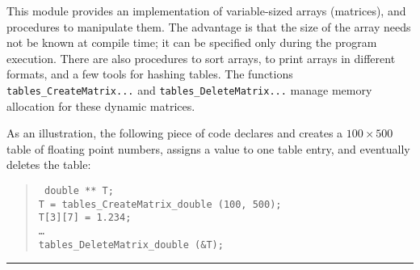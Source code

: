 
This module provides an implementation of variable-sized arrays (matrices),
and procedures to manipulate them.
The advantage is that the size of the array needs not be known
at compile time; it can be specified only during the program execution.
There are also procedures to sort arrays,  to
print  arrays in different formats,
and a few tools for hashing tables.
The functions {\tt tables\_CreateMatrix...} and
{\tt tables\_DeleteMatrix...} manage memory allocation for
these dynamic matrices.

As an illustration, the following piece of code declares and creates
a $100\times 500$ table of floating point numbers, assigns a value
to one table entry, and eventually deletes the table:
  \begin{verse}{\tt
    double ** T;\\
    T = tables\_CreateMatrix\_double (100, 500);\\
    T[3][7] = 1.234;\\
    \dots \\
    tables\_DeleteMatrix\_double (\&T);
  }\end{verse}

\bigskip\hrule

